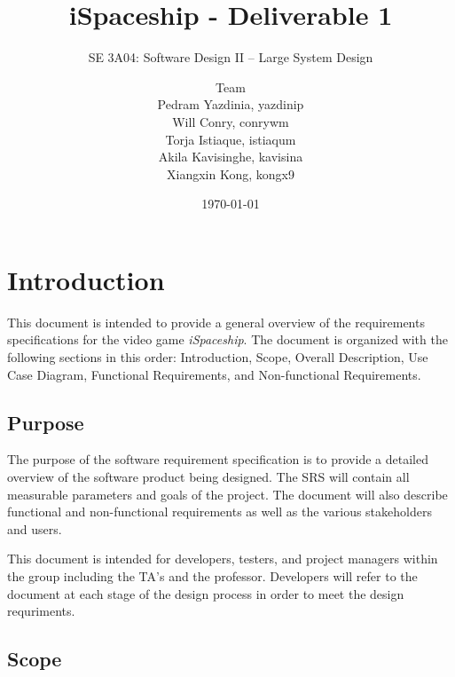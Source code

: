 \documentclass[]{article}
\title{iSpaceship - Deliverable 1}
\author{SE 3A04: Software Design II -- Large System Design}
\author{Team
		\\ Pedram Yazdinia, yazdinip
		\\ Will Conry, conrywm
		\\ Torja Istiaque, istiaqum
		\\ Akila Kavisinghe, kavisina
		\\ Xiangxin Kong, kongx9
}
\date{\today}
\begin{document}
\newpage

\maketitle	
\tableofcontents
\newpage
\section{Introduction}
\label{sec:introduction}


This document is intended to provide a general overview of the requirements specifications for the video game \textit{iSpaceship}. The document is organized with the following sections in this order: Introduction, Scope, Overall Description, Use Case Diagram, Functional Requirements, and Non-functional Requirements. 

\subsection{Purpose}
\label{sub:purpose}
	The purpose of the software requirement specification is to provide a detailed overview of the software product being designed. The SRS will contain all measurable parameters and goals of the project. The document will also describe functional and non-functional requirements as well as the various stakeholders and users.
	
	This document is intended for developers, testers, and project managers within the group including the TA’s and the professor. Developers will refer to the document at each stage of the design process in order to meet the design requriments. 
	


\subsection{Scope}
\label{sub:scope}
	
\end{document}
